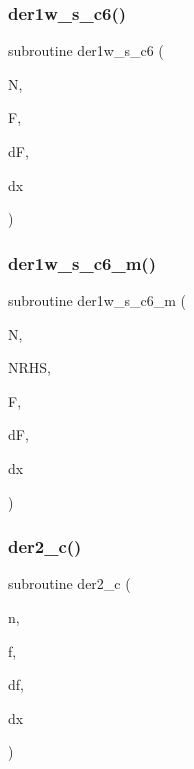 \mbox{\label{ders__n_8f_a85318cd87491a83396b40821098eb08e}} 
\subsubsection{\texorpdfstring{der1w\+\_\+s\+\_\+c6()}{der1w\_s\_c6()}}
{\footnotesize\ttfamily subroutine der1w\+\_\+s\+\_\+c6 (\begin{DoxyParamCaption}\item[{integer}]{N,  }\item[{real, dimension(n)}]{F,  }\item[{real, dimension(0\+:n)}]{dF,  }\item[{real}]{dx }\end{DoxyParamCaption})}

\mbox{\label{ders__n_8f_a7ab82ea5067cf682f4d0dc56db0cbe81}} 
\subsubsection{\texorpdfstring{der1w\+\_\+s\+\_\+c6\+\_\+m()}{der1w\_s\_c6\_m()}}
{\footnotesize\ttfamily subroutine der1w\+\_\+s\+\_\+c6\+\_\+m (\begin{DoxyParamCaption}\item[{integer}]{N,  }\item[{integer}]{N\+R\+HS,  }\item[{real, dimension(n,nrhs)}]{F,  }\item[{real, dimension(0\+:n,nrhs)}]{dF,  }\item[{real}]{dx }\end{DoxyParamCaption})}

\mbox{\label{ders__n_8f_a6ab3dfe06be2475da5f66b58d9dabd52}} 
\subsubsection{\texorpdfstring{der2\+\_\+c()}{der2\_c()}}
{\footnotesize\ttfamily subroutine der2\+\_\+c (\begin{DoxyParamCaption}\item[{integer}]{n,  }\item[{real, dimension(n+1)}]{f,  }\item[{real, dimension(n+1)}]{df,  }\item[{}]{dx }\end{DoxyParamCaption})}


